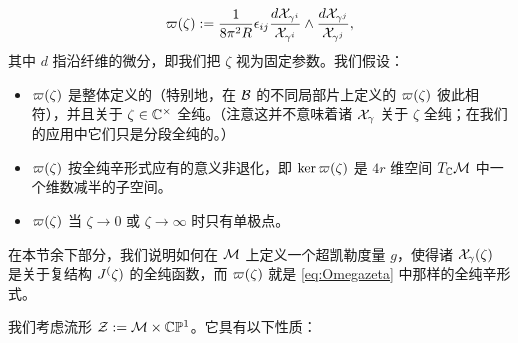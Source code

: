 \begin{equation} \label{eq:darboux}
\varpi(\zeta) := \frac{1}{8 \pi^2 R} \epsilon_{ij} \frac{d \mathcal{X}_{\gamma^i}}{\mathcal{X}_{\gamma^i}} \wedge \frac{d \mathcal{X}_{\gamma^j}}{\mathcal{X}_{\gamma^j}},
\end{equation}
其中 $d$ 指沿纤维的微分，即我们把 $\zeta$ 视为固定参数。我们假设：
\begin{itemize}

\item $\varpi(\zeta)$ 是整体定义的（特别地，在 $\mathcal{B}$ 的不同局部片上定义的 $\varpi(\zeta)$ 彼此相符），并且关于 $\zeta \in \mathbb{C}^\times$ 全纯。（注意这并不意味着诸 $\mathcal{X}_\gamma$ 关于 $\zeta$ 全纯；在我们的应用中它们只是分段全纯的。）

\item $\varpi(\zeta)$ 按全纯辛形式应有的意义非退化，即 $\ker \varpi(\zeta)$ 是 $4r$ 维空间 $T_{\mathbb{C}} \mathcal{M}$ 中一个维数减半的子空间。

\item $\varpi(\zeta)$ 当 $\zeta \to 0$ 或 $\zeta \to \infty$ 时只有单极点。

\end{itemize}
在本节余下部分，我们说明如何在 $\mathcal{M}$ 上定义一个超凯勒度量 $g$，使得诸 $\mathcal{X}_\gamma(\zeta)$ 是关于复结构 $J^(\zeta)$ 的全纯函数，而 $\varpi(\zeta)$ 就是 \eqref{eq:Omegazeta} 中那样的全纯辛形式。

我们考虑流形 $\mathcal{Z} := \mathcal{M} \times \mathbb{C}\mathbb{P}^1$。它具有以下性质：


